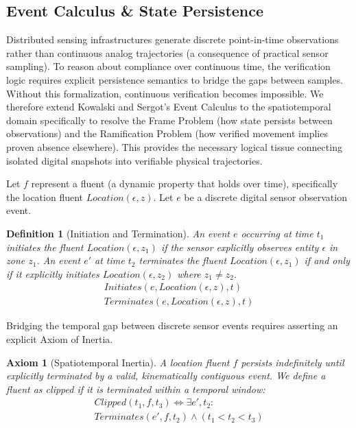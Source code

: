 \documentclass[conference]{IEEEtran}
\newtheorem{definition}{Definition}
\newtheorem{axiom}{Axiom}
\begin{document}
\subsection{Event Calculus \& State Persistence}



Distributed sensing infrastructures generate discrete point-in-time observations rather than continuous analog trajectories (a consequence of practical sensor sampling). To reason about compliance over continuous time, the verification logic requires explicit persistence semantics to bridge the gaps between samples. Without this formalization, continuous verification becomes impossible. We therefore extend Kowalski and Sergot's Event Calculus \cite{b2, b19} to the spatiotemporal domain specifically to resolve the Frame Problem (how state persists between observations) and the Ramification Problem (how verified movement implies proven absence elsewhere). This provides the necessary logical tissue connecting isolated digital snapshots into verifiable physical trajectories.

Let $f$ represent a fluent (a dynamic property that holds over time), specifically the location fluent $Location(\epsilon, z)$. Let $e$ be a discrete digital sensor observation event.

\begin{definition}[Initiation and Termination]
An event $e$ occurring at time $t_1$ initiates the fluent $Location(\epsilon, z_1)$ if the sensor explicitly observes entity $\epsilon$ in zone $z_1$. An event $e'$ at time $t_2$ terminates the fluent $Location(\epsilon, z_1)$ if and only if it explicitly initiates $Location(\epsilon, z_2)$ where $z_1 \neq z_2$.
\begin{align}
Initiates(e, Location(\epsilon, z), t) \\
Terminates(e, Location(\epsilon, z), t) 
\end{align}
\end{definition}

Bridging the temporal gap between discrete sensor events requires asserting an explicit Axiom of Inertia.

\begin{axiom}[Spatiotemporal Inertia]
A location fluent $f$ persists indefinitely until explicitly terminated by a valid, kinematically contiguous event. We define a fluent as clipped if it is terminated within a temporal window:
\begin{align}
Clipped(t_1, f, t_3) \iff \exists e', t_2 : \nonumber \\
Terminates(e', f, t_2) \land (t_1 < t_2 < t_3)
\end{align}
\end{axiom}
\end{document}
